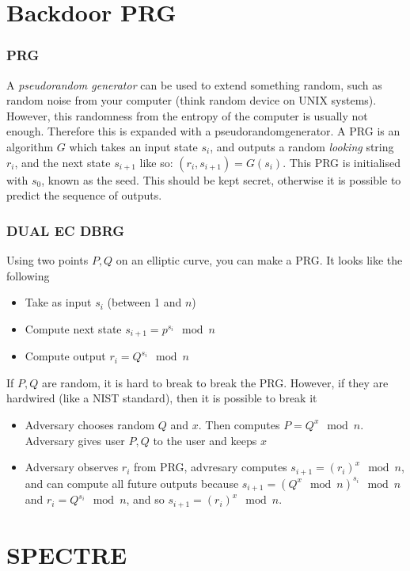 \documentclass[14pt]{beamer}
\begin{document}
\section{Backdoor PRG}
\begin{frame}
    \frametitle{PRG}
        A \textit{pseudorandom generator} can be used to extend something random, such as random noise from your computer (think random device on UNIX systems). However, this randomness from the entropy of the computer is usually not enough. Therefore this is expanded with a pseudorandomgenerator. A PRG is an algorithm $G$ which takes an input state $s_i$, and outputs a random \textit{looking} string $r_i$, and the next state $s_{i + 1}$ like so: $(r_i, s_{i +1}) = G(s_i)$. This PRG is initialised with $s_0$, known as the seed. This should be kept secret, otherwise it is possible to predict the sequence of outputs. 
\end{frame}
    \begin{frame}
        \frametitle{DUAL EC DBRG}
            Using two points $P, Q$ on an elliptic curve, you can make a PRG. It looks like the following
            \begin{itemize}
                \item Take as input $s_i$ (between 1 and $n$)
                \item Compute next state $s_{i + 1} = p^{s_i} \mod n$
                \item Compute output $r_i = Q^{s_i} \mod n$
            \end{itemize}
            If $P, Q$ are random, it is hard to break to break the PRG. However, if they are hardwired (like a NIST standard), then it is possible to break it
            \begin{itemize}
                \item Adversary chooses random $Q$ and $x$. Then computes $P = Q^x \mod n$. Adversary gives user $P, Q$ to the user and keeps $x$
                \item Adversary observes $r_i$ from PRG, advresary computes $s_{i + 1} = (r_i)^x \mod n$, and can compute all future outputs because $s_{i + 1} = (Q^x \mod n)^{s_i} \mod n$ and $r_i = Q^{s_i} \mod n$, and so $s_{i + 1} = (r_i)^x \mod n$.  
            \end{itemize}
    \end{frame}


\section{SPECTRE}
\end{document}
